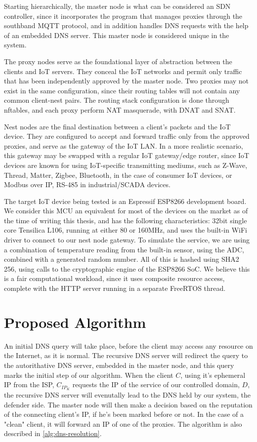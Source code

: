Starting hierarchically, the master node is what can be considered an SDN controller, since it incorporates the program that manages proxies through the southband MQTT protocol, and in addition handles DNS requests with the help of an embedded DNS server. This master node is considered unique in the system.

The proxy nodes serve as the foundational layer of abstraction between the clients and IoT servers. They conceal the IoT networks and permit only traffic that has been independently approved by the master node. Two proxies may not exist in the same configuration, since their routing tables will not contain any common client-nest pairs. The routing stack configuration is done through nftables, and each proxy perform NAT masquerade, with DNAT and SNAT.

Nest nodes are the final destination between a client's packets and the IoT device. They are configured to accept and forward traffic only from the approved proxies, and serve as the gateway of the IoT LAN. In a more realistic scenario, this gateway may be swapped with a regular IoT gateway/edge router, since IoT devices are known for using IoT-specific transmitting mediums, such as Z-Wave, Thread, Matter, Zigbee, Bluetooth, in the case of consumer IoT devices, or Modbus over IP, RS-485 in industrial/SCADA devices.

The target IoT device being tested is an Espressif ESP8266 development board. We consider this MCU an equivalent for most of the devices on the market as of the time of writing this thesis, and has the following characteristics: 32bit single core Tensilica L106, running at either 80 or 160MHz, and uses the built-in WiFi driver to connect to our nest node gateway. To simulate the service, we are using a combination of temperature reading from the built-in sensor, using the ADC, combined with a generated random number. All of this is hashed using SHA2 256, using calls to the cryptographic engine of the ESP8266 SoC. We believe this is a fair computational workload, since it uses composite resource access, complete with the HTTP server running in a separate FreeRTOS thread.


\section{Proposed Algorithm}

An initial DNS query will take place, before the client may access any resource on the Internet, as it is normal. The recursive DNS server will redirect the query to the autorithative DNS server, embedded in the master node, and this query marks the initial step of our algorithm. When the client $C$, using it's ephemeral IP from the ISP, $C_{IP_K}$ requests the IP of the service of our controlled domain, $D$, the recursive DNS server will evenutally lead to the DNS held by our system, the defender side. The master node will then make a decision based on the reputation of the connecting client's IP, if he's been marked before or not. In the case of a "clean" client, it will forward an IP of one of the proxies. The algorithm is also described in \autoref{alg:dns-resolution}\cite{vladescu2025}.

